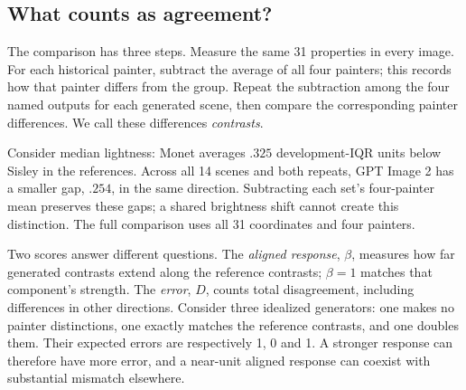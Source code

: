 \documentclass[11pt]{article}
\begin{document}
\subsection{What counts as agreement?}\label{sec:contrast-intuition}
The comparison has three steps. Measure the same 31 properties in every image.
For each historical painter, subtract the average of all four painters; this
records how that painter differs from the group. Repeat the subtraction among
the four named outputs for each generated scene, then compare the corresponding
painter differences. We call these differences \emph{contrasts}.

Consider median lightness: Monet averages $.325$ development-IQR units below
Sisley in the references. Across all 14 scenes and both repeats, GPT Image 2
has a smaller gap, $.254$, in the same direction. Subtracting each set's
four-painter mean preserves these gaps; a shared brightness shift cannot create
this distinction. The full comparison uses all 31 coordinates and four painters.

Two scores answer different questions. The \emph{aligned response}, $\beta$,
measures how far generated contrasts extend along the reference contrasts;
$\beta=1$ matches that component's strength. The \emph{error}, $D$, counts total
disagreement, including differences in other directions. Consider three idealized
generators: one makes no painter distinctions, one exactly matches the reference
contrasts, and one doubles them. Their expected errors are respectively 1, 0
and 1. A stronger response can therefore have more error, and a near-unit
aligned response can coexist with substantial mismatch elsewhere.
\end{document}
